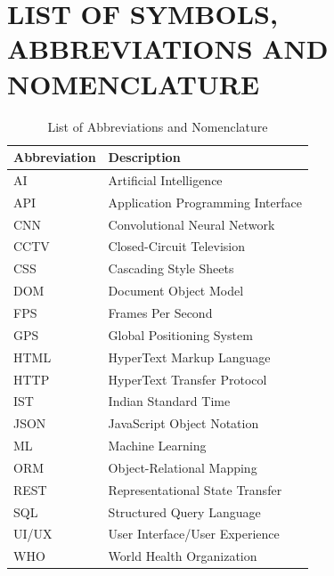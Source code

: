 \documentclass[12pt,a4paper]{article}
\begin{document}
\newpage

\tableofcontents
\newpage

\listoftables
\newpage

\listoffigures
\newpage

\section*{LIST OF SYMBOLS, ABBREVIATIONS AND NOMENCLATURE}

\begin{table}[h]
\centering
\begin{tabular}{|l|l|}
\hline
\textbf{Abbreviation} & \textbf{Description} \\
\hline
AI & Artificial Intelligence \\
\hline
API & Application Programming Interface \\
\hline
CNN & Convolutional Neural Network \\
\hline
CCTV & Closed-Circuit Television \\
\hline
CSS & Cascading Style Sheets \\
\hline
DOM & Document Object Model \\
\hline
FPS & Frames Per Second \\
\hline
GPS & Global Positioning System \\
\hline
HTML & HyperText Markup Language \\
\hline
HTTP & HyperText Transfer Protocol \\
\hline
IST & Indian Standard Time \\
\hline
JSON & JavaScript Object Notation \\
\hline
ML & Machine Learning \\
\hline
ORM & Object-Relational Mapping \\
\hline
REST & Representational State Transfer \\
\hline
SQL & Structured Query Language \\
\hline
UI/UX & User Interface/User Experience \\
\hline
WHO & World Health Organization \\
\hline
\end{tabular}
\caption{List of Abbreviations and Nomenclature}
\end{table}
\end{document}
